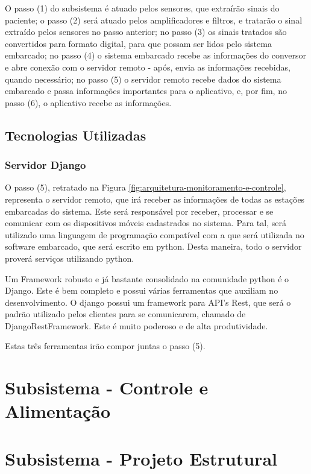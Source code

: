 O passo (1) do subsistema é atuado pelos sensores, que extraírão sinais do paciente;
o passo (2) será atuado pelos amplificadores e filtros, e tratarão o sinal
extraído pelos sensores no passo anterior; no passo (3) os sinais tratados
são convertidos para formato digital, para que possam ser lidos pelo sistema
embarcado; no passo (4) o sistema embarcado recebe as informações do conversor
e abre conexão com o servidor remoto - após, envia as informações recebidas,
quando necessário; no passo (5) o servidor remoto recebe dados do sistema
embarcado e passa informações importantes para o aplicativo, e, por fim,
no passo (6), o aplicativo recebe as informações.

\subsection{Tecnologias Utilizadas}

\subsubsection{Servidor Django}
\label{sub:servidor_django}
O passo (5), retratado na Figura \ref{fig:arquitetura-monitoramento-e-controle},
representa o servidor remoto, que irá receber as informações de todas as
estações embarcadas do sistema. Este será responsável por receber, processar
e se comunicar com os dispositivos móveis cadastrados no sistema. Para tal,
será utilizado uma linguagem de programação compatível com a que será utilizada
no software embarcado, que será escrito em python. Desta maneira, todo
o servidor proverá serviços utilizando python.

Um Framework robusto e já bastante consolidado na comunidade python é o Django.
Este é bem completo e possui várias ferramentas que auxiliam no desenvolvimento.
O django possui um framework para API's Rest, que será o padrão utilizado pelos
clientes para se comunicarem, chamado de DjangoRestFramework. Este é muito poderoso
e de alta produtividade.

Estas três ferramentas irão compor juntas o passo (5).

\section{Subsistema - Controle e Alimentação}

\section{Subsistema - Projeto Estrutural}

